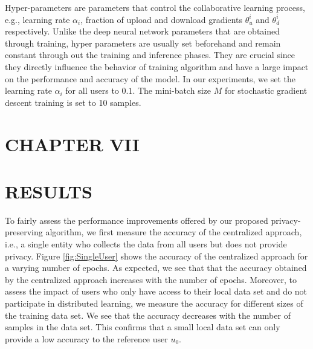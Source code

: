 \documentclass[letterpaper]{article}
\begin{document}
\begin{flushleft}
{%

Hyper-parameters are parameters that control the collaborative learning process, e.g., learning rate $\alpha_i$, fraction of upload and
download gradients $\theta^i_u$ and $\theta^i_d$ respectively. Unlike the deep neural network parameters that are obtained through
training, hyper parameters are usually set beforehand and remain constant through out the training and inference phases. They are
crucial since they directly influence the behavior of training algorithm and have a large impact on the performance and accuracy of the
model. In our experiments, we set the learning rate $\alpha_i$ for all users to $0.1$.  The mini-batch size $M$ for stochastic gradient
descent training is set to 10 samples.





\pagebreak
\section*{CHAPTER VII}
\vspace{0.25in}
\section{RESULTS}

To fairly assess the performance improvements offered by our proposed privacy-preserving algorithm, we first measure the accuracy of
the centralized approach, i.e., a single entity who collects the data from all users but does not provide privacy. 
Figure \ref{fig:SingleUser} shows the accuracy of the centralized approach for a varying number of epochs. As expected, we see that
that the accuracy obtained by the centralized approach increases with the number of epochs. 
Moreover, to assess the impact of users who only have access to their local data set and do not participate in distributed
learning, we measure the accuracy for different sizes of the training data set. We see that the accuracy decreases with the number
of samples in the data set. This confirms that a small local data set can only provide a low accuracy to the reference user $u_0$.


}
\end{flushleft}
\end{document}
